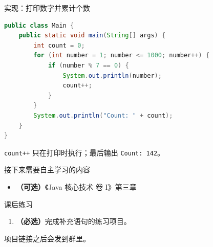 \documentclass[aspectratio=169]{beamer}
\begin{document}
\begin{frame}[fragile]{实现：打印数字并累计个数}
  \begin{lstlisting}[language=Java]
public class Main {
    public static void main(String[] args) {
        int count = 0;
        for (int number = 1; number <= 1000; number++) {
            if (number % 7 == 0) {
                System.out.println(number);
                count++;
            }
        }
        System.out.println("Count: " + count);
    }
}
  \end{lstlisting}
  \texttt{count++} 只在打印时执行；最后输出 \texttt{Count: 142}。
\end{frame}

\begin{frame}{接下来需要自主学习的内容}
  \begin{itemize}
    \item \textbf{（可选）}《Java 核心技术 卷 I》第三章
  \end{itemize}
\end{frame}

\begin{frame}{课后练习}
  \begin{enumerate}
    \item \textbf{（必选）}完成补充语句的练习项目。
  \end{enumerate}
  \bigskip
  项目链接之后会发到群里。
\end{frame}
\end{document}

